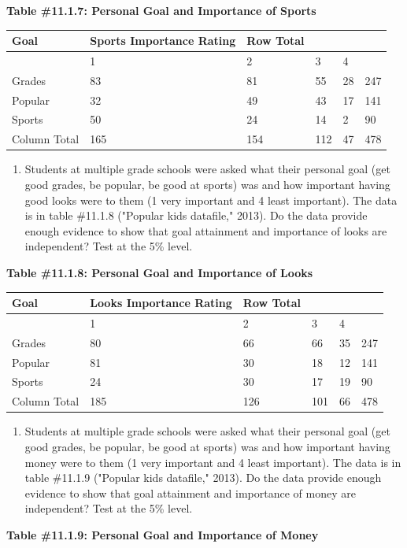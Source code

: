 \documentclass[]{book}
\providecommand{\tightlist}{%
  \setlength{\itemsep}{0pt}\setlength{\parskip}{0pt}}
\begin{document}
\textbf{Table \#11.1.7: Personal Goal and Importance of Sports}

\begin{longtable}[]{@{}llllll@{}}
\toprule
Goal & Sports Importance Rating & Row Total & & &\tabularnewline
\midrule
\endhead
& 1 & 2 & 3 & 4 &\tabularnewline
Grades & 83 & 81 & 55 & 28 & 247\tabularnewline
Popular & 32 & 49 & 43 & 17 & 141\tabularnewline
Sports & 50 & 24 & 14 & 2 & 90\tabularnewline
Column Total & 165 & 154 & 112 & 47 & 478\tabularnewline
\bottomrule
\end{longtable}

\begin{enumerate}
\def\labelenumi{\arabic{enumi}.}
\setcounter{enumi}{6}
\tightlist
\item
  Students at multiple grade schools were asked what their personal goal (get good grades, be popular, be good at sports) was and how important having good looks were to them (1 very important and 4 least important). The data is in table \#11.1.8 ("Popular kids datafile," 2013). Do the data provide enough evidence to show that goal attainment and importance of looks are independent? Test at the 5\% level.
\end{enumerate}

\textbf{Table \#11.1.8: Personal Goal and Importance of Looks}

\begin{longtable}[]{@{}llllll@{}}
\toprule
Goal & Looks Importance Rating & Row Total & & &\tabularnewline
\midrule
\endhead
& 1 & 2 & 3 & 4 &\tabularnewline
Grades & 80 & 66 & 66 & 35 & 247\tabularnewline
Popular & 81 & 30 & 18 & 12 & 141\tabularnewline
Sports & 24 & 30 & 17 & 19 & 90\tabularnewline
Column Total & 185 & 126 & 101 & 66 & 478\tabularnewline
\bottomrule
\end{longtable}

\begin{enumerate}
\def\labelenumi{\arabic{enumi}.}
\setcounter{enumi}{7}
\tightlist
\item
  Students at multiple grade schools were asked what their personal goal (get good grades, be popular, be good at sports) was and how important having money were to them (1 very important and 4 least important). The data is in table \#11.1.9 ("Popular kids datafile," 2013). Do the data provide enough evidence to show that goal attainment and importance of money are independent? Test at the 5\% level.
\end{enumerate}

\textbf{Table \#11.1.9: Personal Goal and Importance of Money}
\end{document}
